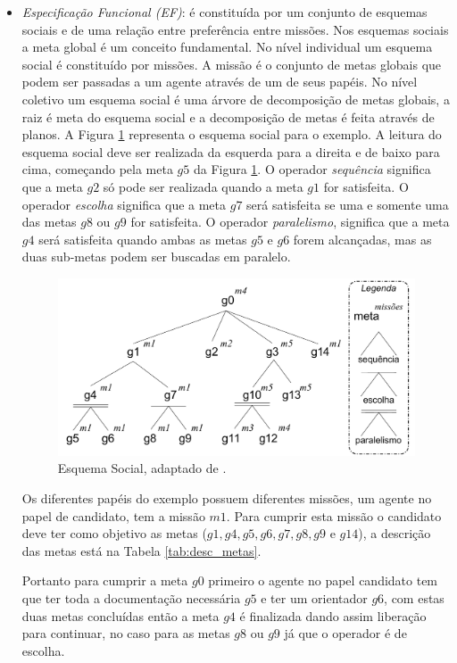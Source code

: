 \begin{itemize}
\item {\it Especificação Funcional (EF)}: é constituída por um conjunto de esquemas sociais e de uma relação entre preferência entre missões. Nos esquemas sociais a meta global é um conceito fundamental. No nível individual um esquema social é constituído por missões. A missão é o conjunto de metas globais que podem ser passadas a um agente através de um de seus papéis. No nível coletivo um esquema social é uma árvore de decomposição de metas globais, a raiz é meta do esquema social e a decomposição de metas é feita através de planos. A Figura \ref{fig:es_exemplo} representa o esquema social para o exemplo. A leitura do esquema social deve ser realizada da esquerda para a direita e de baixo para cima, começando pela meta $g5$ da Figura \ref{fig:es_exemplo}. O operador \textit{sequência} significa que a meta $g2$ só pode ser realizada quando a meta $g1$ for satisfeita. O operador \textit{escolha} significa que a meta $g7$ será satisfeita se uma e somente uma das metas $g8$ ou $g9$ for satisfeita. O operador \textit{paralelismo}, significa que a meta $g4$ será satisfeita quando ambas as metas $g5$ e $g6$ forem alcançadas, mas as duas sub-metas podem ser buscadas em paralelo. 
\begin{figure}[ht]
\centering
\includegraphics[scale=0.4]{imagens/ES2.pdf}
\caption{Esquema Social, adaptado de \cite{hubner2003modelo}.}
\label{fig:es_exemplo}
\end{figure}

Os diferentes papéis do exemplo possuem diferentes missões, um agente no papel de candidato, tem a missão $m1$. Para cumprir esta missão o candidato deve ter como objetivo as metas ($g1, g4, g5, g6, g7, g8, g9$ e $g14$), a descrição das metas está na Tabela \ref{tab:desc_metas}.

Portanto para cumprir a meta $g0$ primeiro o agente no papel candidato tem que ter toda a documentação necessária $g5$ e ter um orientador $g6$, com estas duas metas concluídas então a meta $g4$ é finalizada dando assim liberação para continuar, no caso para as metas $g8$ ou $g9$ já que o operador é de escolha.


\end{itemize}
